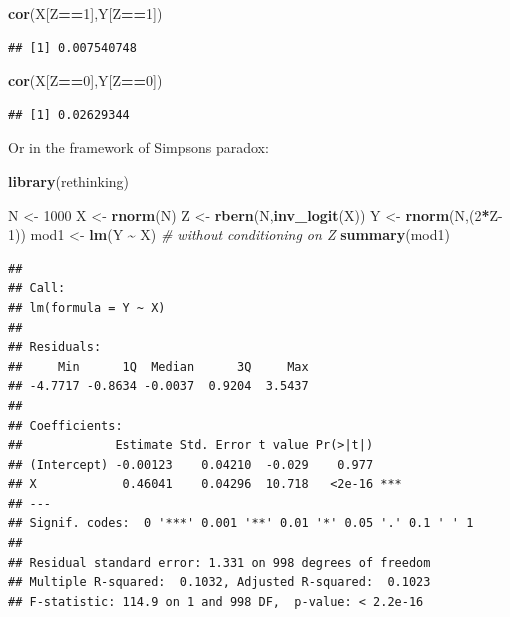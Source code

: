 \documentclass[
]{book}
\newenvironment{Shaded}{\begin{snugshade}}{\end{snugshade}}
\newcommand{\CommentTok}[1]{\textcolor[rgb]{0.56,0.35,0.01}{\textit{#1}}}
\newcommand{\DecValTok}[1]{\textcolor[rgb]{0.00,0.00,0.81}{#1}}
\newcommand{\FunctionTok}[1]{\textcolor[rgb]{0.13,0.29,0.53}{\textbf{#1}}}
\newcommand{\NormalTok}[1]{#1}
\newcommand{\OtherTok}[1]{\textcolor[rgb]{0.56,0.35,0.01}{#1}}
\newcommand{\SpecialCharTok}[1]{\textcolor[rgb]{0.81,0.36,0.00}{\textbf{#1}}}
\begin{document}
\begin{Shaded}
\begin{Highlighting}[]
\FunctionTok{cor}\NormalTok{(X[Z}\SpecialCharTok{==}\DecValTok{1}\NormalTok{],Y[Z}\SpecialCharTok{==}\DecValTok{1}\NormalTok{])}
\end{Highlighting}
\end{Shaded}

\begin{verbatim}
## [1] 0.007540748
\end{verbatim}

\begin{Shaded}
\begin{Highlighting}[]
\FunctionTok{cor}\NormalTok{(X[Z}\SpecialCharTok{==}\DecValTok{0}\NormalTok{],Y[Z}\SpecialCharTok{==}\DecValTok{0}\NormalTok{])}
\end{Highlighting}
\end{Shaded}

\begin{verbatim}
## [1] 0.02629344
\end{verbatim}

Or in the framework of Simpsons paradox:

\begin{Shaded}
\begin{Highlighting}[]
\FunctionTok{library}\NormalTok{(rethinking)}

\NormalTok{N }\OtherTok{\textless{}{-}} \DecValTok{1000}
\NormalTok{X }\OtherTok{\textless{}{-}} \FunctionTok{rnorm}\NormalTok{(N)}
\NormalTok{Z }\OtherTok{\textless{}{-}} \FunctionTok{rbern}\NormalTok{(N,}\FunctionTok{inv\_logit}\NormalTok{(X))}
\NormalTok{Y }\OtherTok{\textless{}{-}} \FunctionTok{rnorm}\NormalTok{(N,(}\DecValTok{2}\SpecialCharTok{*}\NormalTok{Z}\DecValTok{{-}1}\NormalTok{))}
\NormalTok{mod1 }\OtherTok{\textless{}{-}} \FunctionTok{lm}\NormalTok{(Y }\SpecialCharTok{\textasciitilde{}}\NormalTok{ X) }\CommentTok{\# without conditioning on Z}
\FunctionTok{summary}\NormalTok{(mod1)}
\end{Highlighting}
\end{Shaded}

\begin{verbatim}
## 
## Call:
## lm(formula = Y ~ X)
## 
## Residuals:
##     Min      1Q  Median      3Q     Max 
## -4.7717 -0.8634 -0.0037  0.9204  3.5437 
## 
## Coefficients:
##             Estimate Std. Error t value Pr(>|t|)    
## (Intercept) -0.00123    0.04210  -0.029    0.977    
## X            0.46041    0.04296  10.718   <2e-16 ***
## ---
## Signif. codes:  0 '***' 0.001 '**' 0.01 '*' 0.05 '.' 0.1 ' ' 1
## 
## Residual standard error: 1.331 on 998 degrees of freedom
## Multiple R-squared:  0.1032, Adjusted R-squared:  0.1023 
## F-statistic: 114.9 on 1 and 998 DF,  p-value: < 2.2e-16
\end{verbatim}
\end{document}
